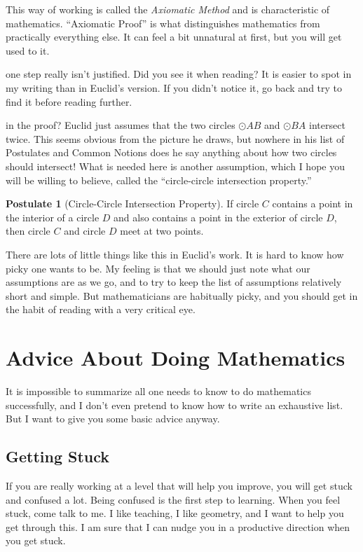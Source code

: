 \documentclass{tufte-handout}
\theoremstyle{definition}
\newtheorem*{postulate}{Postulate}
\begin{document}
This way of working is called the \emph{Axiomatic Method} and is characteristic of mathematics.
``Axiomatic Proof'' is what distinguishes mathematics from practically everything else.
It can feel a bit unnatural at first, but you will get used to it.

 one step really isn't justified.
Did you see it when reading? 
It is easier to spot in my writing than in Euclid's version. 
If you didn't notice it, go back and try to find it before reading further. \\

\vfill
\pagebreak

 in the proof? 
Euclid just assumes that the two circles $\odot AB$ and $\odot BA$ intersect twice. 
This seems obvious from the picture he draws, but nowhere in his list of Postulates and Common Notions does he say anything about how two circles should intersect! 
What is needed here is another assumption, which I hope you will be willing to believe, called the ``circle-circle intersection property.'' 
\begin{postulate}[Circle-Circle Intersection Property] 
If circle $C$ contains a point in the interior of a circle $D$ and also contains a point in the exterior of circle $D$, then circle $C$ and circle $D$ meet at two points. 
\end{postulate}

There are lots of little things like this in Euclid's work.
It is hard to know how picky one wants to be. 
My feeling is that we should just note what our assumptions are as we go, and to try to keep the list of assumptions relatively short and simple. 
But mathematicians are habitually picky, and you should get in the habit of reading with a very critical eye.


\section*{Advice About Doing Mathematics}
 It is impossible to summarize all one needs to know to do mathematics successfully, and I don't even pretend to know how to write an exhaustive list.
 But I want to give you some basic advice anyway. 

\subsection*{Getting Stuck}
If you are really working at a level that will help you improve, you will get stuck and confused a lot.
Being confused is the first step to learning.
When you feel stuck, come talk to me.
I like teaching, I like geometry, and I want to help you get through this.
I am sure that I can nudge you in a productive direction when you get stuck.
\end{document}
